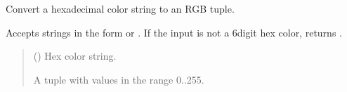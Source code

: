 \documentclass[letterpaper,10pt,english]{sphinxmanual}
\begin{document}
\begin{fulllineitems}
\label{\detokenize{api/colors:colors.hex_to_rgb}}
\pysigstartsignatures
\pysiglinewithargsret
{}
{}
{}
\pysigstopsignatures
\sphinxAtStartPar
Convert a hexadecimal color string to an RGB tuple.

\sphinxAtStartPar
Accepts strings in the form  or . If the input is not a
6\sphinxhyphen{}digit hex color, returns .
\begin{quote}\begin{description}
\sphinxAtStartPar
{} () \textendash{} Hex color string.

\sphinxAtStartPar
{}

\sphinxAtStartPar
A tuple  with values in the range 0..255.

\end{description}\end{quote}

\end{fulllineitems}

\end{document}
